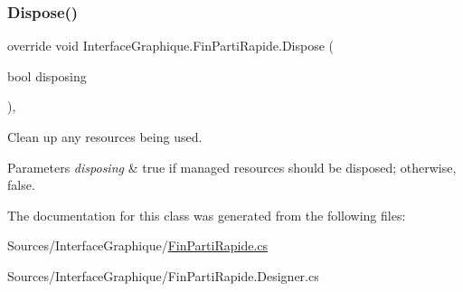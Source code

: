 \subsubsection{\texorpdfstring{Dispose()}{Dispose()}}
{\footnotesize\ttfamily override void Interface\+Graphique.\+Fin\+Parti\+Rapide.\+Dispose (\begin{DoxyParamCaption}\item[{bool}]{disposing }\end{DoxyParamCaption})\hspace{0.3cm}{\ttfamily [inline]}, {\ttfamily [protected]}}



Clean up any resources being used. 


\begin{DoxyParams}{Parameters}
{\em disposing} & true if managed resources should be disposed; otherwise, false.\\
\hline
\end{DoxyParams}


The documentation for this class was generated from the following files\+:\begin{DoxyCompactItemize}
\item 
Sources/\+Interface\+Graphique/\hyperlink{_fin_parti_rapide_8cs}{Fin\+Parti\+Rapide.\+cs}\item 
Sources/\+Interface\+Graphique/Fin\+Parti\+Rapide.\+Designer.\+cs\end{DoxyCompactItemize}
